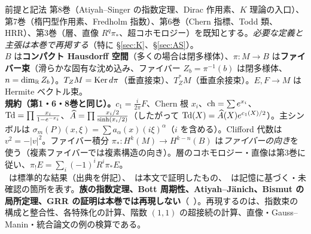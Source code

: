 \begin{goalbox}{前提と記法}
第8巻（Atiyah--Singer の指数定理、Dirac 作用素、$K$ 理論の入口）、第7巻（楕円型作用素、Fredholm 指数）、第6巻（Chern 指標、Todd 類、HRR）、第3巻（層、直像 $R^q\pi_*$、超コホモロジー）を既知とする。\emph{必要な定義と主張は本巻で再掲する}（特に \S\ref{sec:K}、\S\ref{sec:AS}）。\\
$B$ は\textbf{コンパクト Hausdorff 空間}（多くの場合は閉多様体）、$\pi:M\to B$ は\textbf{ファイバー束}（滑らかな固有な沈め込み、ファイバー $Z_b=\pi^{-1}(b)$ は閉多様体、$n=\dim_{\mathbb R}Z_b$）。$T_ZM=\operatorname{Ker} d\pi$（垂直接束）、$T_Z^*M$（垂直余接束）。$E,F\to M$ は Hermite ベクトル束。\\
\textbf{規約（第1・6・8巻と同じ）。}$c_1=\frac i{2\pi}F$、Chern 根 $x_i$、$\mathrm{ch}=\sum e^{x_i}$、$\mathrm{Td}=\prod\frac{x_i}{1-e^{-x_i}}$、$\widehat{A}=\prod\frac{x_i/2}{\sinh(x_i/2)}$（したがって $\mathrm{Td}(X)=\widehat{A}(X)e^{c_1(X)/2}$）。主シンボルは $\sigma_m(P)(x,\xi)=\sum a_\alpha(x)(i\xi)^\alpha$（$i$ を含める）。Clifford 代数は $v^2=-|v|^2$。ファイバー積分 $\pi_*:H^k(M)\to H^{k-n}(B)$ は\emph{ファイバーの向き}を使う（複素ファイバーでは複素構造の向き）。層のコホモロジー・直像は第3巻に従い、$\pi_!E=\sum_i(-1)^iR^i\pi_*E$。\\
\tC\ は標準的な結果（出典を併記）、\tP\ は本文で証明したもの、\tQ\ は記憶に基づく・未確認の箇所を表す。\textbf{族の指数定理、Bott 周期性、Atiyah--J\"anich、Bismut の局所定理、GRR の証明は本巻では再現しない}（\tC\ ）。再現するのは、指数束の構成と整合性、各特殊化の計算、階数 $(1,1)$ の超接続の計算、直像・Gauss--Manin・統合論文の例の検算である。
\end{goalbox}
\setcounter{tocdepth}{2}\tableofcontents
\newpage
